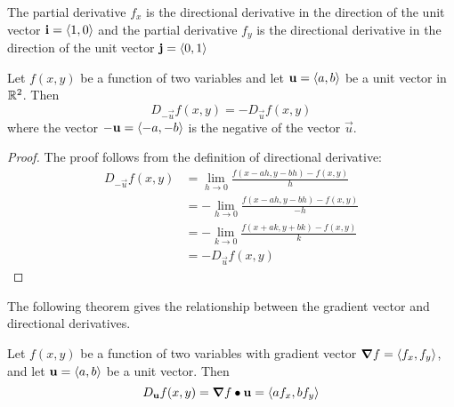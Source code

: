 \documentclass[handout]{ximera}
\begin{document}
\begin{remark}
The partial derivative $f_x$ is the directional derivative in the direction of the unit vector $\mathbf i = \left\langle 1,0\right\rangle$ and 
the partial derivative $f_y$ is the directional derivative in the direction of the unit vector $\mathbf j = \left\langle 0,1\right\rangle$
\end{remark}

\begin{proposition}
Let $f(x,y)$ be a function of two variables and let $\mathbf u = \left\langle a,b\right\rangle$ be a unit vector in $\mathbb R^2$. Then
\[
D_{-\vec u} f(x,y) = -D_{\vec u} f(x,y)
\]
where the vector $-\mathbf u = \left\langle -a, -b\right\rangle$ is the negative of the vector $\vec u$.
\end{proposition}

\begin{proof}
The proof follows from the definition of directional derivative:
\begin{align*}
D_{-\vec u} f(x,y) &= \lim_{h \to 0} \frac{f(x - ah, y - bh) -f(x,y)}{h} \\
                   &= -\lim_{h \to 0} \frac{f(x - ah, y - bh) -f(x,y)}{-h} \\
                   &= -\lim_{k \to 0} \frac{f(x + ak, y  + bk) -f(x,y)}{k} \\
                   &= -D_{\vec u} f(x,y)
\end{align*}
\end{proof}

The following theorem gives the relationship between the gradient vector and directional derivatives.

\begin{theorem}
Let $f(x,y)$ be a function of two variables with gradient vector $\boldsymbol\nabla f = \left\langle f_x, f_y\right\rangle$, and let $\mathbf u = \left\langle a,b\right\rangle$ be a unit vector.
Then
\[
D_{\mathbf u} f(x,y) = \boldsymbol\nabla f \bullet \mathbf u = \left\langle af_x, bf_y\right\rangle
\]
\end{theorem}
\end{document}
